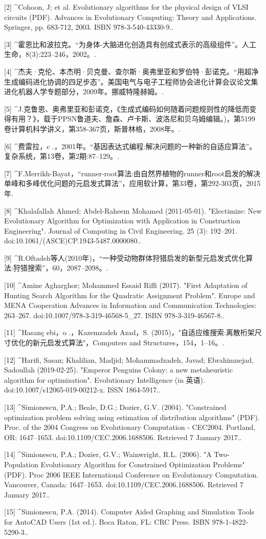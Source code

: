 [2]
^Cohoon, J; et al. Evolutionary algorithms for the physical design of VLSI circuits (PDF). Advances in Evolutionary Computing: Theory and Applications. Springer, pp. 683-712, 2003. ISBN 978-3-540-43330-9..

[3]
^霍恩比和波拉克。“为身体-大脑进化创造具有创成式表示的高级组件”。人工生命，8(3):223–246，2002。.

[4]
^杰夫·克伦、本杰明·贝克曼、查尔斯·奥弗里亚和罗伯特·彭诺克。“用超净生成编码进化协调的四足步态”。美国电气与电子工程师协会进化计算会议论文集进化机器人学专题部分，2009年。挪威特隆赫姆。.

[5]
^J.克鲁恩、奥弗里亚和彭诺克，《生成式编码如何随着问题规则性的降低而变得有用？》，载于PPSN鲁道夫、詹森、卢卡斯、波洛尼和贝乌姆编辑。)，第5199卷计算机科学讲义，第358-367页，斯普林格，2008年。.

[6]
^费雷拉，c .，2001年。“基因表达式编程:解决问题的一种新的自适应算法”。复杂系统，第13卷，第2期:87–129。.

[7]
^F.Merrikh-Bayat，“runner-root算法:由自然界植物的runner和root启发的解决单峰和多峰优化问题的元启发式算法”，应用软计算，第33卷，第292-303页，2015年.

[8]
^Khalafallah Ahmed; Abdel-Raheem Mohamed (2011-05-01). "Electimize: New Evolutionary Algorithm for Optimization with Application in Construction Engineering". Journal of Computing in Civil Engineering. 25 (3): 192–201. doi:10.1061/(ASCE)CP.1943-5487.0000080..

[9]
^R.Oftadeh等人(2010年)，“一种受动物群体狩猎启发的新型元启发式优化算法:狩猎搜索”，60，2087–2098。.

[10]
^Amine Agharghor; Mohammed Essaid Riffi (2017). "First Adaptation of Hunting Search Algorithm for the Quadratic Assignment Problem". Europe and MENA Cooperation Advances in Information and Communication Technologies: 263–267. doi:10.1007/978-3-319-46568-5_27. ISBN 978-3-319-46567-8..

[11]
^Hasanç ebi，o .，Kazemzadeh Azad，S. (2015)，"自适应维搜索:离散桁架尺寸优化的新元启发式算法"，Computers and Structures，154，1–16。.

[12]
^Harifi, Sasan; Khalilian, Madjid; Mohammadzadeh, Javad; Ebrahimnejad, Sadoullah (2019-02-25). "Emperor Penguins Colony: a new metaheuristic algorithm for optimization". Evolutionary Intelligence (in 英语). doi:10.1007/s12065-019-00212-x. ISSN 1864-5917..

[13]
^Simionescu, P.A.; Beale, D.G.; Dozier, G.V. (2004). "Constrained optimization problem solving using estimation of distribution algorithms" (PDF). Proc. of the 2004 Congress on Evolutionary Computation - CEC2004. Portland, OR: 1647–1653. doi:10.1109/CEC.2006.1688506. Retrieved 7 January 2017..

[14]
^Simionescu, P.A.; Dozier, G.V.; Wainwright, R.L. (2006). "A Two-Population Evolutionary Algorithm for Constrained Optimization Problems" (PDF). Proc 2006 IEEE International Conference on Evolutionary Computation. Vancouver, Canada: 1647–1653. doi:10.1109/CEC.2006.1688506. Retrieved 7 January 2017..

[15]
^Simionescu, P.A. (2014). Computer Aided Graphing and Simulation Tools for AutoCAD Users (1st ed.). Boca Raton, FL: CRC Press. ISBN 978-1-4822-5290-3..
